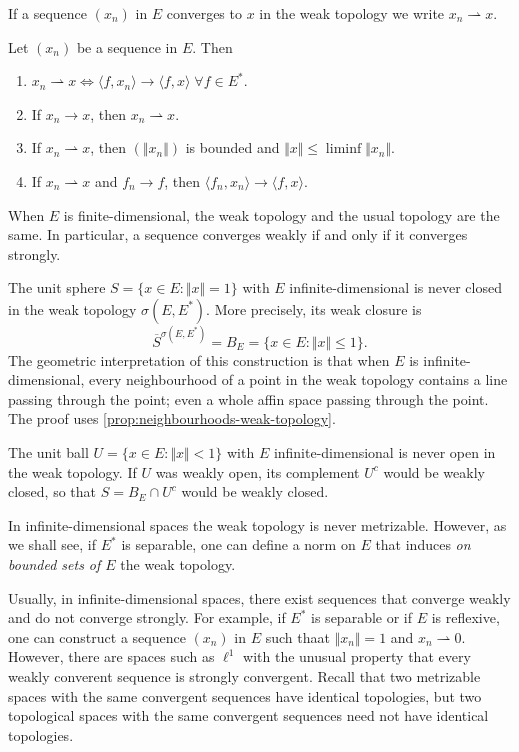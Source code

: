 \documentclass{article}
\theoremstyle{definition}
\numberwithin{equation}{section}
\begin{document}
	If a sequence $(x_n)$ in $E$ converges to $x$ in the weak topology we write $x_n\rightharpoonup x$.
	\begin{prop}
		Let $(x_n)$ be a sequence in $E$. Then
		\begin{enumerate}
			\item $x_n\rightharpoonup x \iff \langle f,x_n\rangle\to\langle f,x\rangle\;\forall f\in E^*$.
			\item If $x_n\to x$, then $x_n\rightharpoonup x$.
			\item If $x_n\rightharpoonup x$, then $(\Vert x_n\Vert)$ is bounded and $\Vert x\Vert\leq \liminf\Vert x_n\Vert$.
			\item If $x_n\rightharpoonup x$ and $f_n\to f$, then $\langle f_n,x_n\rangle\to\langle f,x\rangle$.
		\end{enumerate}
	\end{prop}
	\begin{prop}
		When $E$ is finite-dimensional, the weak topology and the usual topology are the same. In particular, a sequence converges weakly if and only if it converges strongly.
	\end{prop}
	\begin{example}
		The unit sphere $S=\{x\in E:\Vert x\Vert=1\}$ with $E$ infinite-dimensional is never closed in the weak topology $\sigma (E,E^*)$. More precisely, its weak closure is
		\[\overline{S}^{\sigma(E,E^*)}=B_E=\{x\in E:\Vert x\Vert\leq1\}.\]
		The geometric interpretation of this construction is that when $E$ is infinite-dimensional, every neighbourhood of a point in the weak topology contains a line passing through the point; even a whole affin space passing through the point. The proof uses \cref{prop:neighbourhoods-weak-topology}.
	\end{example}
	\begin{example}
		The unit ball $U=\{x\in E:\Vert x\Vert<1\}$ with $E$ infinite-dimensional is never open in the weak topology. If $U$ was weakly open, its complement $U^c$ would be weakly closed, so that $S=B_E\cap U^c$ would be weakly closed.
	\end{example}
	\begin{remark}
		In infinite-dimensional spaces the weak topology is never metrizable. However, as we shall see, if $E^*$ is separable, one can define a norm on $E$ that induces \textit{on bounded sets of $E$} the weak topology.
	\end{remark}
	\begin{remark}
		Usually, in infinite-dimensional spaces, there exist sequences that converge weakly and do not converge strongly. For example, if $E^*$ is separable or if $E$ is reflexive, one can construct a sequence $(x_n)$ in $E$ such thaat $\Vert x_n\Vert =1$ and $x_n\rightharpoonup0$. However, there are spaces such as $\ell^1$ with the unusual property that every weakly converent sequence is strongly convergent. Recall that two metrizable spaces with the same convergent sequences have identical topologies, but two topological spaces with the same convergent sequences need not have identical topologies.
	\end{remark}
	
\end{document}
